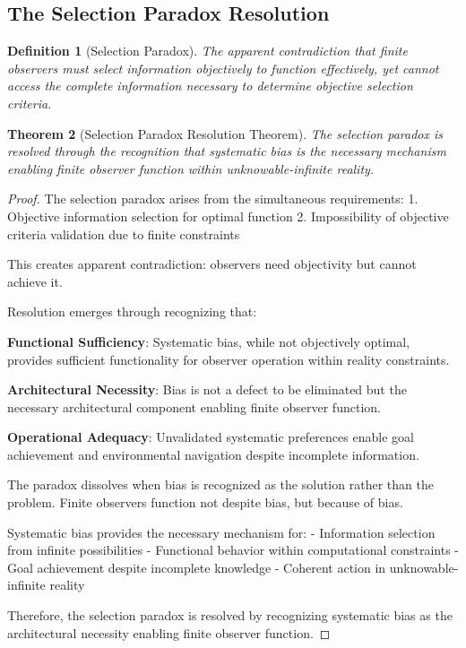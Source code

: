 \documentclass[12pt,a4paper]{article}
\newtheorem{theorem}{Theorem}[section]
\newtheorem{definition}[theorem]{Definition}
\begin{document}
\subsection{The Selection Paradox Resolution}

\begin{definition}[Selection Paradox]
The apparent contradiction that finite observers must select information objectively to function effectively, yet cannot access the complete information necessary to determine objective selection criteria.
\end{definition}

\begin{theorem}[Selection Paradox Resolution Theorem]
The selection paradox is resolved through the recognition that systematic bias is the necessary mechanism enabling finite observer function within unknowable-infinite reality.
\end{theorem}

\begin{proof}
The selection paradox arises from the simultaneous requirements:
1. Objective information selection for optimal function
2. Impossibility of objective criteria validation due to finite constraints

This creates apparent contradiction: observers need objectivity but cannot achieve it.

Resolution emerges through recognizing that:

\textbf{Functional Sufficiency}: Systematic bias, while not objectively optimal, provides sufficient functionality for observer operation within reality constraints.

\textbf{Architectural Necessity}: Bias is not a defect to be eliminated but the necessary architectural component enabling finite observer function.

\textbf{Operational Adequacy}: Unvalidated systematic preferences enable goal achievement and environmental navigation despite incomplete information.

The paradox dissolves when bias is recognized as the solution rather than the problem. Finite observers function not despite bias, but because of bias.

Systematic bias provides the necessary mechanism for:
- Information selection from infinite possibilities
- Functional behavior within computational constraints  
- Goal achievement despite incomplete knowledge
- Coherent action in unknowable-infinite reality

Therefore, the selection paradox is resolved by recognizing systematic bias as the architectural necessity enabling finite observer function.
\end{proof}
\end{document}
